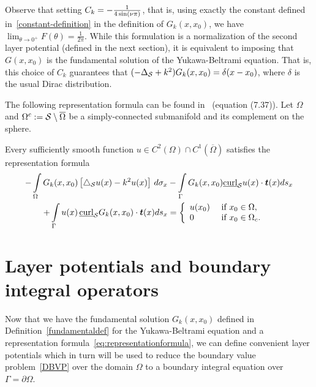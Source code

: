 Observe that setting $\C=-\frac{1}{4\sin(\nu \pi)}$, that is, using
exactly the constant defined in~\eqref{constant-definition} in the
definition of $G_k(x,x_0)$, we have $\lim_{\theta\rightarrow
0^+}F(\theta)=\frac{1}{2\pi}.$  While this formulation is a
normalization of the second layer potential (defined in the next
section), it is equivalent to imposing that $G(x,x_{0})$ is the
fundamental solution of the Yukawa-Beltrami equation.  That is, this
choice of $C_{k}$ guarantees that $(-\Delta_{\S} + k^{2})G_{k}(x,x_{0})
= \delta(x-x_{0})$, where $\delta$ is the usual Dirac distribution.

The following representation formula can be found in~\cite{mit:tay1999}
(equation (7.37)).  Let $\Omega$ and
$\Omega^{c}:=\S\setminus{\overline{\Omega}}$ be a simply-connected
submanifold and its complement on the sphere. 
\begin{proposition}
\label{prop:repr}
Every sufficiently smooth function $u \in C^{2}(\Omega) \cap
C^{1}(\overline{\Omega})$ satisfies the representation formula
\begin{align} 
\label{eq:representationformula}
 - \int\limits_{\Omega} 
    G_k(x,x_{0})\left[\lap_{\S}u(x) -k^2 u(x)\right]\,d\sigma_x 
 &- \int\limits_{{\Gamma}} G_k(x,x_{0})  
    \underline{\mbox{curl}}_{\S} u(x) \cdot \vec{t}(x) ds_x \nonumber \\
 + \int\limits_{{\Gamma}}  u(x)
 \,\underline{\mbox{curl}}_{{\S}} G_k(x,x_0) \cdot \vec{t}(x) ds_x 
 &= \left\{ \begin{array}{ll} u(x_0) & \mbox{ if $x_0\in \Omega$},\\
  0 & \mbox{ if  $x_0\in{\Omega}_c$}. 
  \end{array} \right.
\end{align}
\end{proposition}


\section{Layer potentials and boundary integral operators}
Now that we have the fundamental solution $G_k(x,x_0)$ defined in
Definition~\ref{fundamentaldef} for the Yukawa-Beltrami equation and a
representation formula~\eqref{eq:representationformula}, we can define
convenient layer potentials which in turn will be used to reduce the
boundary value problem~\eqref{DBVP} over the domain $\Omega$ to a
boundary integral equation over $\Gamma = \partial \Omega$.


